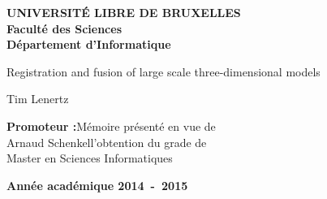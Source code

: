 \frontmatter
\begin{titlepage}
\begin{center}
\textbf{UNIVERSIT\'E LIBRE DE BRUXELLES}\\
\textbf{Faculté des Sciences}\\
\textbf{Département d'Informatique}
\vfill{}\vfill{}

{\Huge
Registration and fusion of large scale
\vspace*{.5cm} \linebreak[4]
three-dimensional models}

{\Huge \par}
\begin{center}{\LARGE Tim Lenertz}\end{center}{\Huge \par}
\vfill{}\vfill{}
\begin{flushright}
{\large \textbf{Promoteur :}}\hfill{}{\large Mémoire présenté en vue de}\\
{\large Arnaud Schenkel}\hfill{}{\large l'obtention du grade de}\\
\hfill{}{\large Master en Sciences Informatiques}\
\end{flushright}{\large\par}
\vfill{}\vfill{}\enlargethispage{3cm}
\textbf{Année académique 2014~-~2015}
\end{center}
\end{titlepage}
